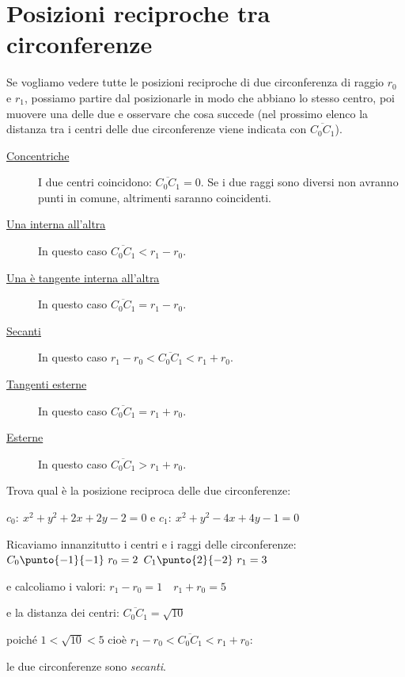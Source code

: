 \section{Posizioni reciproche tra circonferenze}
\label{sec:circ_posizionireciproche}

Se vogliamo vedere tutte le posizioni reciproche di due circonferenza  
di raggio \(r_0\) e \(r_1\), possiamo partire dal posizionarle in modo che 
abbiano lo stesso centro, poi muovere una delle due e osservare che cosa 
succede (nel prossimo elenco la distanza tra i centri delle due circonferenze 
viene indicata con \(\overline{C_0 C_1}\)).

\begin{description} %
 \item [\underline{Concentriche}]
I due centri coincidono: \(\overline{C_0 C_1} = 0\).
Se i due raggi sono diversi non avranno punti in comune, altrimenti saranno 
coincidenti.
 \item [\underline{Una interna all'altra}]
In questo caso \(\overline{C_0 C_1} < r_1 - r_0\).
 \item [\underline{Una è tangente interna all'altra}]
In questo caso \(\overline{C_0 C_1} = r_1 - r_0\).
 \item [\underline{Secanti}]
In questo caso \(r_1 - r_0 < \overline{C_0 C_1} < r_1 + r_0\).
 \item [\underline{Tangenti esterne}]
In questo caso \(\overline{C_0 C_1} = r_1 + r_0\).
 \item [\underline{Esterne}]
In questo caso \(\overline{C_0 C_1} > r_1 + r_0\).
\end{description}

\begin{esempio}
Trova qual è la posizione reciproca delle due circonferenze:

\(c_0:~x^2 + y^2 +2x +2y -2 = 0\) e \(c_1:~x^2 + y^2 -4x +4y -1 = 0\) 

Ricaviamo innanzitutto i centri e i raggi delle circonferenze: \\
\(C_0 \punto{-1}{-1} ~ r_0 = 2\) \qquad 
\(C_1 \punto{2}{-2} ~ r_1 = 3\) 

e calcoliamo i valori: \quad \(r_1 - r_0 = 1 \quad r_1 + r_0 = 5\) 

e la distanza dei centri: \quad \(\overline{C_0 C_1} = \sqrt{10}\) 

poiché \quad \(1 < \sqrt{10} < 5\) cioè \quad 
\(r_1 - r_0 < \overline{C_0 C_1} < r_1 + r_0\): 

le due circonferenze sono \emph{secanti}.
\end{esempio}

